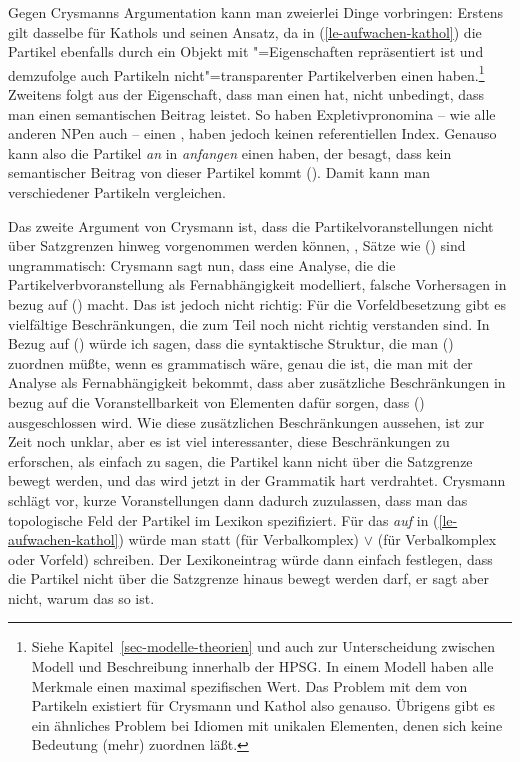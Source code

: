 Gegen Crysmanns Argumentation kann man zweierlei Dinge vorbringen: Erstens
gilt dasselbe für Kathols und seinen Ansatz, da in (\ref{le-aufwachen-kathol})
die Partikel ebenfalls durch ein Objekt mit "=Eigenschaften repräsentiert
ist und demzufolge auch Partikeln nicht"=transparenter Partikelverben einen \contw haben.\footnote{
Siehe Kapitel~\ref{sec-modelle-theorien} und auch 
zur Unterscheidung zwischen Modell und Beschreibung innerhalb der HPSG. In einem
Modell haben alle Merkmale einen maximal spezifischen Wert. Das Problem mit dem
\contw von Partikeln existiert für Crysmann und Kathol also genauso. Übrigens gibt
es ein ähnliches Problem bei Idiomen mit unikalen Elementen, denen sich keine
Bedeutung (mehr) zuordnen läßt.%
} 
Zweitens folgt aus der
Eigenschaft, dass man einen \contw hat, nicht unbedingt, dass man einen semantischen
Beitrag leistet. So haben Expletivpronomina 
-- wie alle anderen NPen auch -- einen \contw, 
haben jedoch keinen referentiellen Index. Genauso kann also die
Partikel \emph{an} in \emph{anfangen} einen \contw haben, der besagt, dass kein
semantischer Beitrag von dieser Partikel kommt (\zb {}).
Damit kann man \contwe verschiedener Partikeln vergleichen.

Das zweite Argument von Crysmann ist, dass die Partikelvoranstellungen
nicht über Satzgrenzen hinweg vorgenommen werden können, \dash, Sätze wie
() sind ungrammatisch:
\z
{}
Crysmann sagt nun, dass eine Analyse, die die Partikelverbvoranstellung als
Fernabhängigkeit modelliert, falsche Vorhersagen in bezug auf () macht.
Das ist jedoch nicht richtig: Für die Vorfeldbesetzung gibt es vielfältige
Beschränkungen, die zum Teil noch nicht richtig verstanden sind. In Bezug auf ()
würde ich sagen, dass die syntaktische Struktur, die man () zuordnen
müßte, wenn es grammatisch wäre, genau die ist, die man mit der Analyse als
Fernabhängigkeit bekommt, dass aber zusätzliche Beschränkungen in bezug auf die Voranstellbarkeit
von Elementen dafür sorgen, dass () ausgeschlossen wird.
Wie diese zusätzlichen Beschränkungen aussehen, ist zur Zeit noch unklar, aber
es ist viel interessanter, diese Beschränkungen zu erforschen, als einfach zu sagen,
die Partikel kann nicht über die Satzgrenze bewegt werden, und das wird jetzt in
der Grammatik hart verdrahtet. Crysmann schlägt vor, kurze Voranstellungen
dann dadurch zuzulassen, dass man das topologische Feld der Partikel im Lexikon
spezifiziert. Für das \emph{auf} in (\ref{le-aufwachen-kathol})
würde man statt  (für Verbalkomplex)
 $\vee$  (für Verbalkomplex oder Vorfeld) schreiben.
Der Lexikoneintrag würde dann einfach festlegen, dass die Partikel nicht über die Satzgrenze 
hinaus bewegt werden darf, er sagt aber nicht, warum das so ist.

